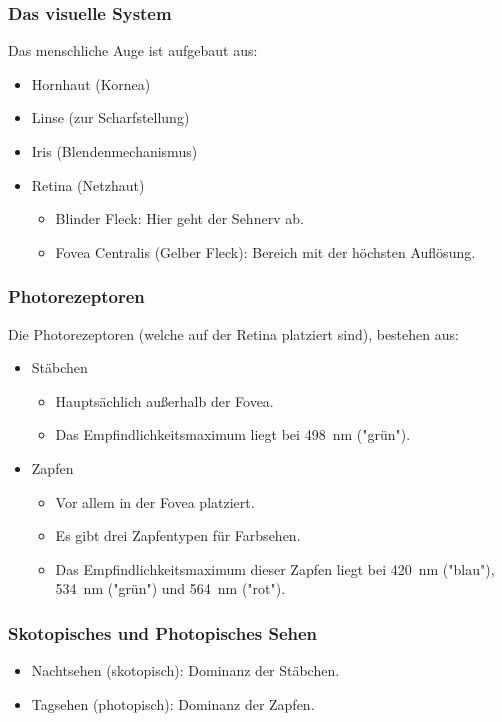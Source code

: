 			\subsubsection{Das visuelle System}
				Das menschliche Auge ist aufgebaut aus:
				\begin{itemize}
					\item Hornhaut (Kornea)
					\item Linse (zur Scharfstellung)
					\item Iris (Blendenmechanismus)
					\item Retina (Netzhaut)
						\begin{itemize}
							\item Blinder Fleck: Hier geht der Sehnerv ab.
							\item Fovea Centralis (Gelber Fleck): Bereich mit der höchsten Auflösung.
						\end{itemize}
				\end{itemize}

			\subsubsection{Photorezeptoren}
				Die Photorezeptoren (welche auf der Retina platziert sind), bestehen aus:
				\begin{itemize}
					\item Stäbchen
						\begin{itemize}
							\item Hauptsächlich außerhalb der Fovea.
							\item Das Empfindlichkeitsmaximum liegt bei \SI{498}{\nano\meter} ("grün").
						\end{itemize}
					\item Zapfen
						\begin{itemize}
							\item Vor allem in der Fovea platziert.
							\item Es gibt drei Zapfentypen für Farbsehen.
							\item Das Empfindlichkeitsmaximum dieser Zapfen liegt bei \SI{420}{\nano\meter} ("blau"), \SI{534}{\nano\meter} ("grün") und \SI{564}{\nano\meter} ("rot").
						\end{itemize}
				\end{itemize}

			\subsubsection{Skotopisches und Photopisches Sehen}
				\begin{itemize}
					\item Nachtsehen (skotopisch): Dominanz der Stäbchen.
					\item Tagsehen (photopisch): Dominanz der Zapfen.
				\end{itemize}

